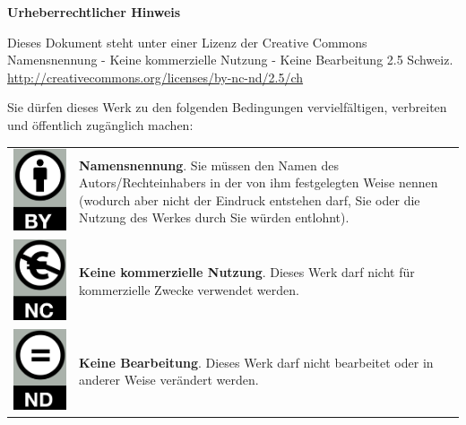 \documentclass[11pt, twoside, a4paper]{book}		%
\begin{document}
\begin{titlepage}
	\clearpage
	\pagestyle{empty}
	\centering
	
	\textbf{Urheberrechtlicher Hinweis}

	\hspace{1cm}

	Dieses Dokument steht unter einer Lizenz der Creative Commons Namensnennung - Keine kommerzielle Nutzung - Keine Bearbeitung 2.5 Schweiz.\\ \url{http://creativecommons.org/licenses/by-nc-nd/2.5/ch}
	
	\hspace{1cm}

	\RaggedRight Sie dürfen dieses Werk zu den folgenden Bedingungen vervielfältigen, verbreiten und öffentlich zugänglich machen:

	\begin{table}[h]
		\centering
		\small
		\begin{tabular}{c m{}}
			\raisebox{-.47\height} 	{\includegraphics[width=.1\textwidth]{png/CC_by_me}}
			&
			\textbf{Namensnennung}. Sie müssen den Namen des Autors/Rechteinhabers in der von ihm festgelegten Weise nennen (wodurch aber nicht der Eindruck entstehen darf, Sie oder die Nutzung des Werkes durch Sie würden entlohnt). \\
			\rule{0pt}{9ex}%
			\raisebox{-.5\height} {\includegraphics[width=.1\textwidth]{png/CC_nc_me}}
			&
			\textbf{Keine kommerzielle Nutzung}. Dieses Werk darf nicht für kommerzielle Zwecke verwendet werden. \\
			\rule{0pt}{9ex}%
			\raisebox{-.5\height} {\includegraphics[width=.1\textwidth]{png/CC_nd_me}}
			&
			\textbf{Keine Bearbeitung}. Dieses Werk darf nicht bearbeitet oder in anderer Weise verändert werden. \\
		\end{tabular}
	\end{table}
	

\end{titlepage}
\end{document}
